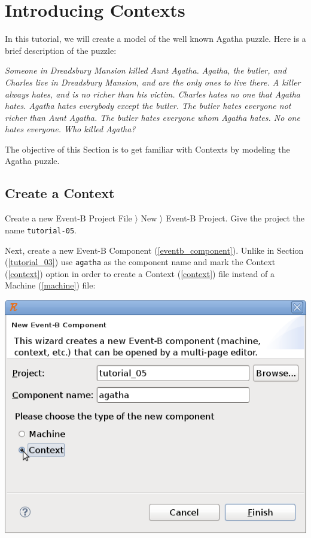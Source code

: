 \section{Introducing Contexts}
\label{tutorial_05}


In this tutorial, we will create a model of the well known Agatha puzzle. Here is a brief description of the puzzle:

\textit{Someone in Dreadsbury Mansion killed Aunt Agatha. Agatha, the butler, and Charles live in Dreadsbury Mansion, and are the only ones to live there. A killer always hates, and is no richer than his victim. Charles hates no one that Agatha hates. Agatha hates everybody except the butler. The butler hates everyone not richer than Aunt Agatha. The butler hates everyone whom Agatha hates. No one hates everyone. Who killed Agatha?}

The objective of this Section is to get familiar with Contexts by modeling the Agatha puzzle.

\subsection{Create a Context}

Create a new Event-B Project \textsf{File $\rangle$ New $\rangle$ Event-B Project}. Give the project the name \texttt{tutorial-05}. 

Next, create a new Event-B Component (\ref{eventb_component}). Unlike in Section (\ref{tutorial_03}) use \texttt{agatha} as the component name and mark the \textsf{Context} (\ref{context}) option in order to create a Context (\ref{context}) file instead of a Machine (\ref{machine}) file:

\begin{center}
	\includegraphics{img/tutorial/tut_05_agatha1.png}
\end{center}

